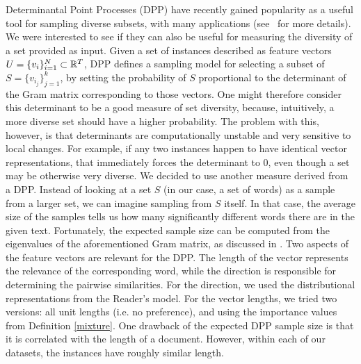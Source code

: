 Determinantal Point Processes (DPP) have recently gained popularity as a
useful tool for sampling diverse subsets, with many applications
(see~\cite{kulesza:2012} for more details). We were interested to see
if they can also be useful for 
measuring the diversity of a set provided as input. Given a set of
instances described as feature vectors $U=\{v_i\}_{i=1}^N\subset {\mathbb R}^T$, DPP defines a
sampling model for selecting a subset of $S=\{v_{i_j}\}_{j=1}^k$, by
setting the probability of $S$ proportional to the determinant of the
Gram matrix corresponding to those vectors. One might therefore
consider this determinant to be a good measure of set diversity,
because, intuitively, a more diverse set should have a higher
probability. The problem with this, however, is that determinants are
computationally unstable and very sensitive to local changes. For
example, if any two instances happen to have identical vector
representations, that immediately forces the determinant to $0$, even
though a set may be otherwise very diverse. We decided to use
another measure derived from a DPP. Instead of looking at a set $S$
(in our case, a set of words) as a sample from a larger set, we can
imagine sampling from $S$ itself. In that case, the average size of
the samples tells us how many significantly different words there are
in the given text. Fortunately, the expected sample size can be
computed from the eigenvalues of the aforementioned Gram matrix, as
discussed in \cite{kulesza:2012}. Two aspects of the feature
vectors are relevant for the DPP. The length of the vector represents
the relevance of the corresponding word, while the direction is
responsible for determining the pairwise similarities. For the
direction, we used the distributional representations from the
Reader's model. For the vector lengths, we tried two versions: all
unit lengths (i.e. no preference), and using the importance values from
Definition \ref{mixture}. One drawback of the expected
DPP sample size is that it is correlated with the length of a
document. However, within each of our datasets, the instances have roughly
similar length.

